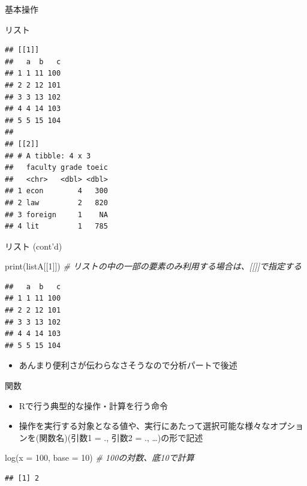 \documentclass[
  ignorenonframetext,
]{beamer}
\newenvironment{Shaded}{\begin{snugshade}}{\end{snugshade}}
\newcommand{\AttributeTok}[1]{\textcolor[rgb]{0.77,0.63,0.00}{#1}}
\newcommand{\CommentTok}[1]{\textcolor[rgb]{0.56,0.35,0.01}{\textit{#1}}}
\newcommand{\DecValTok}[1]{\textcolor[rgb]{0.00,0.00,0.81}{#1}}
\newcommand{\FunctionTok}[1]{\textcolor[rgb]{0.00,0.00,0.00}{#1}}
\newcommand{\NormalTok}[1]{#1}
\providecommand{\tightlist}{%
  \setlength{\itemsep}{0pt}\setlength{\parskip}{0pt}}
\begin{document}
\begin{frame}[fragile]{基本操作}
\begin{block}{リスト}
\begin{verbatim}
## [[1]]
##   a  b   c
## 1 1 11 100
## 2 2 12 101
## 3 3 13 102
## 4 4 14 103
## 5 5 15 104
## 
## [[2]]
## # A tibble: 4 x 3
##   faculty grade toeic
##   <chr>   <dbl> <dbl>
## 1 econ        4   300
## 2 law         2   820
## 3 foreign     1    NA
## 4 lit         1   785
\end{verbatim}
\end{block}

\begin{block}{リスト (cont'd)}
\protect\hypertarget{ux30eaux30b9ux30c8-contd}{}
\begin{Shaded}
\begin{Highlighting}[]
\FunctionTok{print}\NormalTok{(listA[[}\DecValTok{1}\NormalTok{]]) }\CommentTok{\# リストの中の一部の要素のみ利用する場合は、[[]]で指定する}
\end{Highlighting}
\end{Shaded}

\begin{verbatim}
##   a  b   c
## 1 1 11 100
## 2 2 12 101
## 3 3 13 102
## 4 4 14 103
## 5 5 15 104
\end{verbatim}

\begin{itemize}
\tightlist
\item
  あんまり便利さが伝わらなさそうなので分析パートで後述
\end{itemize}
\end{block}

\begin{block}{関数}
\protect\hypertarget{ux95a2ux6570}{}
\begin{itemize}
\tightlist
\item
  Rで行う典型的な操作・計算を行う命令
\item
  操作を実行する対象となる値や、実行にあたって選択可能な様々なオプションを(関数名)(引数1
  = ., 引数2 = ., \ldots)の形で記述
\end{itemize}

\begin{Shaded}
\begin{Highlighting}[]
\FunctionTok{log}\NormalTok{(}\AttributeTok{x =} \DecValTok{100}\NormalTok{, }\AttributeTok{base =} \DecValTok{10}\NormalTok{) }\CommentTok{\# 100の対数、底10で計算}
\end{Highlighting}
\end{Shaded}

\begin{verbatim}
## [1] 2
\end{verbatim}


\end{block}
\end{frame}
\end{document}
